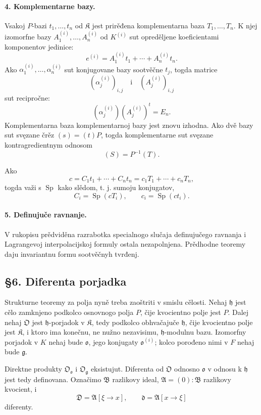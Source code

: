 \documentclass[11pt]{article}
\begin{document}
\paragraph{4. Komplementarne bazy.}
Vsakoj \(P\)-bazi \(t_1,\ldots,t_n\) od \(\mathfrak K\) jest prirěđena komplementarna baza \(T_1,\ldots,T_n\). K njej izomorfne bazy \(A_1^{(i)},\ldots,A_n^{(i)}\) od \(K^{(i)}\) sut opreděljene koeficientami komponentov jedinice:
\[
        e^{(i)}=A_1^{(i)}t_1+
        \cdots+A_n^{(i)}t_n.
\]
Ako \(\alpha_1^{(i)},\ldots,\alpha_n^{(i)}\) sut konjugovane bazy sootvěčne \(t_j\), togda matrice
\[
        (\alpha_j^{(i)})_{i,j}
        \quad\text{i}\quad
        (A_j^{(i)})_{i,j}
\]
sut recipročne:
\[
        (\alpha_j^{(i)})(A_j^{(i)})^{t}=E_n.
\]
Komplementarna baza komplementarnoj bazy jest znovu izhodna. Ako dvě bazy sut svęzane črěz \((s)=(t)P\), togda komplementarne sut svęzane kontragredientnym odnosom
\[
        (S)=P^{-1}(T).
\]

Ako
\[
        c=C_1t_1+
        \cdots+C_nt_n
        =c_1T_1+
        \cdots+c_nT_n,
\]
togda važi s \(\operatorname{Sp}\) kako slědom, t. j. sumoju konjugatov,
\[
        C_i=\operatorname{Sp}(cT_i),
        \qquad
        c_i=\operatorname{Sp}(ct_i).
\]

\paragraph{5. Definujuče ravnanje.}
V rukopisu prědviděna razrabotka specialnogo slučaja definujučego ravnanja i Lagrangevoj interpolacijskoj formuly ostala nezapolnjena. Prědhodne teoremy daju invariantnu formu sootvěčnyh tvrđenj.

\subsection*{§6. Diferenta porjadka}

Strukturne teoremy za polja nyně treba zaoštriti v smislu cělosti. Nehaj \(\mathfrak h\) jest cělo zamknjeno podkolco osnovnogo polja \(P\), čije kvocientno polje jest \(P\). Dalej nehaj \(\mathfrak O\) jest \(\mathfrak h\)-porjadok v \(\mathfrak K\), tedy podkolco obhvačajuče \(\mathfrak h\), čije kvocientno polje jest \(\mathfrak K\), i ktoro ima konečnu, ne nužno nezavisimu, \(\mathfrak h\)-modulnu bazu. Izomorfny porjadok v \(K\) nehaj bude \(\mathfrak o\), jego konjugaty \(\mathfrak o^{(i)}\); kolco porođeno nimi v \(F\) nehaj bude \(\mathfrak g\).

Direktne produkty \(\mathfrak O_{\mathfrak o}\) i \(\mathfrak O_{\mathfrak g}\) eksistujut. Diferenta od \(\mathfrak O\) odnosno \(\mathfrak o\) v odnosu k \(\mathfrak h\) jest tedy definovana. Označimo \(\mathfrak B\) razlikovy ideal, \(\mathfrak A=(0):\mathfrak B\) razlikovy kvocient, i
\[
        \mathfrak D=\mathfrak A[\xi\to x],
        \qquad
        \mathfrak d=\mathfrak A[x\to\xi]
\]
diferenty.
\end{document}
